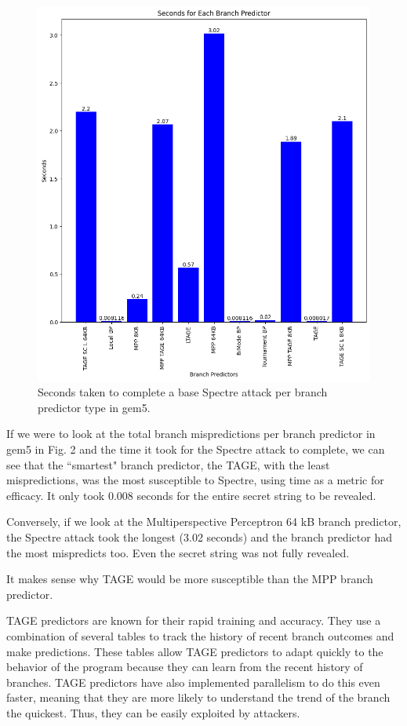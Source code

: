 \documentclass[twocolumn,showpacs,%
  nofootinbib,aps,superscriptaddress,%
  eqsecnum,prd,notitlepage,showkeys,10pt]{revtex4-1}
\begin{document}
\begin{figure}
    \centering
    \includegraphics[width=\linewidth]{Seconds.png}
    \caption{Seconds taken to complete a base Spectre attack per branch predictor type in gem5.}
\end{figure}

If we were to look at the total branch mispredictions per branch predictor in gem5 in Fig. 2 and the time it took for the Spectre attack to complete, we can see that the ``smartest" branch predictor, the TAGE, with the least mispredictions, was the most susceptible to Spectre, using time as a metric for efficacy. It only took 0.008 seconds for the entire secret string to be revealed.

Conversely, if we look at the Multiperspective Perceptron 64 kB branch predictor, the Spectre attack took the longest (3.02 seconds) and the branch predictor had the most mispredicts too. Even the secret string was not fully revealed.

It makes sense why TAGE would be more susceptible than the MPP branch predictor. 

TAGE predictors are known for their rapid training and accuracy. They use a combination of several tables to track the history of recent branch outcomes and make predictions. These tables allow TAGE predictors to adapt quickly to the behavior of the program because they can learn from the recent history of branches. TAGE predictors have also implemented parallelism to do this even faster, meaning that they are more likely to understand the trend of the branch the quickest. Thus, they can be easily exploited by attackers.\cite{seznec2006case}
\end{document}
